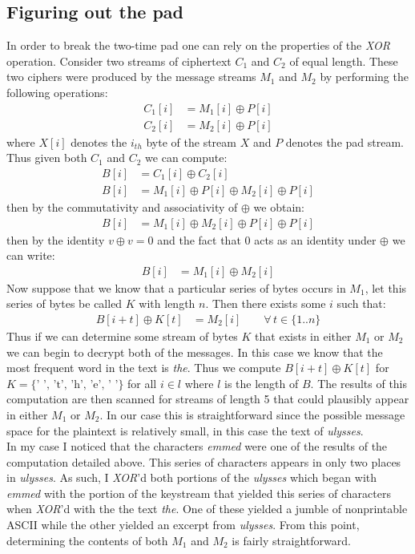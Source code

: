 \documentclass{article}
\begin{document}
\subsection{Figuring out the pad}
In order to break the two-time pad one can rely on the properties of the \textit{XOR} operation. Consider two streams of ciphertext $C_1$ and $C_2$ of equal length. These two ciphers were produced by the message streams $M_1$ and $M_2$ by performing the following operations:
\begin{align*}
    C_1[i] &= M_1[i] \oplus P[i] \\
    C_2[i] &= M_2[i] \oplus P[i] 
\end{align*}
where $X[i]$ denotes the $i_{th}$ byte of the stream $X$ and $P$ denotes the pad stream. Thus given both $C_1$ and $C_2$ we can compute:
\begin{align*}
    B[i] &= C_1[i] \oplus C_2[i] \\
    B[i] &= M_1[i] \oplus P[i] \oplus M_2[i] \oplus P[i] 
\end{align*}
then by the commutativity and associativity of $\oplus$ we obtain:
\begin{align*}
    B[i] &= M_1[i] \oplus M_2[i] \oplus P[i] \oplus P[i]
\end{align*}
then by the identity $v \oplus v = 0$ and the fact that 0 acts as an identity under $\oplus$ we can write:
\begin{align*}
    B[i] &= M_1[i] \oplus M_2[i]
\end{align*}
Now suppose that we know that a particular series of bytes occurs in $M_1$, let this series of bytes be called $K$ with length $n$. Then there exists some $i$ such that: 
\begin{align*}
    B[i + t] \oplus K[t] &= M_2[i]\qquad \forall \, t \in \{1..n\}
\end{align*}
Thus if we can determine some stream of bytes $K$ that exists in either $M_1$ or $M_2$ we can begin to decrypt both of the messages. In this case we know that the most frequent word in the text is \textit{the}. Thus we compute $B[i + t] \oplus K[t]$ for $K=\{ \text{' ', 't', 'h', 'e', ' '} \}$ for all $i \in l$ where $l$ is the length of $B$. The results of this computation are then scanned for streams of length 5 that could plausibly appear in either $M_1$ or $M_2$. In our case this is straightforward since the possible message space for the plaintext is relatively small, in this case the text of \textit{ulysses}.\\

In my case I noticed that the characters \textit{emmed} were one of the results of the computation detailed above. This series of characters appears in only two places in \textit{ulysses}. As such, I \textit{XOR}'d both portions of the \textit{ulysses} which began with \textit{emmed} with the portion of the keystream that yielded this series of characters when \textit{XOR}'d with the the text \textit{the}. One of these yielded a jumble of nonprintable ASCII while the other yielded an excerpt from \textit{ulysses}. From this point, determining the contents of both $M_1$ and $M_2$ is fairly straightforward. 
\end{document}
